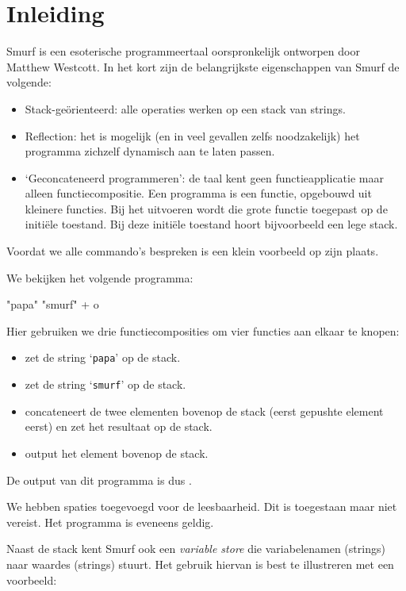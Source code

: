 \section{Inleiding}
\label{sec:intro}

Smurf is een esoterische programmeertaal oorspronkelijk ontworpen door Matthew
Westcott. In het kort zijn de belangrijkste eigenschappen van Smurf de
volgende:
\begin{itemize}
	\item Stack-geörienteerd: alle operaties werken op een stack van strings.
	\item Reflection: het is mogelijk (en in veel gevallen zelfs noodzakelijk)
		het programma zichzelf dynamisch aan te laten passen.
	\item `Geconcateneerd programmeren': de taal kent geen functieapplicatie maar
		alleen functiecompositie. Een programma is een functie, opgebouwd uit
		kleinere functies. Bij het uitvoeren wordt die grote functie toegepast op
		de initiële toestand. Bij deze initiële toestand hoort bijvoorbeeld een
		lege stack.
\end{itemize}
Voordat we alle commando's bespreken is een klein voorbeeld op zijn plaats.

\begin{exmp}
	We bekijken het volgende programma:
	\begin{smurf}"papa" "smurf" + o\end{smurf}
	Hier gebruiken we drie functiecomposities om vier functies aan elkaar te
	knopen:
	\begin{itemize}
		\item {} zet de string `\texttt{papa}' op de stack.
		\item {} zet de string `\texttt{smurf}' op de stack.
		\item \smurfinline{+} concateneert de twee elementen bovenop de stack
			(eerst gepushte element eerst) en zet het resultaat op de stack.
		\item {} output het element bovenop de stack.
	\end{itemize}
	De output van dit programma is dus .

	We hebben spaties toegevoegd voor de leesbaarheid. Dit is toegestaan maar
	niet vereist. Het programma  is eveneens geldig.
\end{exmp}

Naast de stack kent Smurf ook een \emph{variable store} die variabelenamen
(strings) naar waardes (strings) stuurt. Het gebruik hiervan is best te
illustreren met een voorbeeld:

